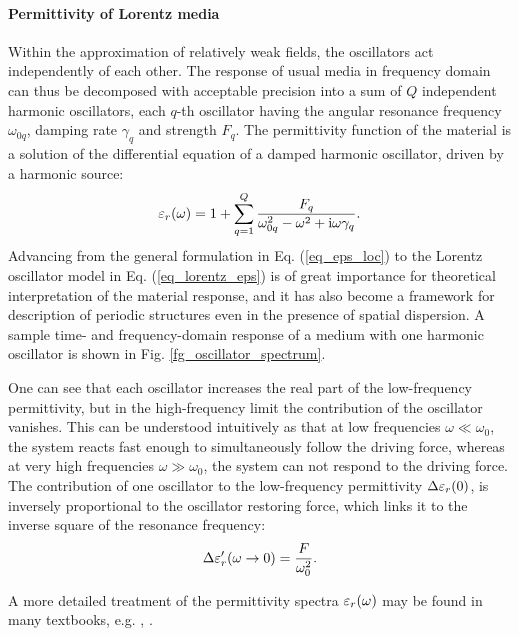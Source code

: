 \paragraph{Permittivity of Lorentz media} Within the approximation of relatively weak fields, the oscillators act independently of each other.
The response of usual media in frequency domain can thus be decomposed with acceptable precision into a sum of $Q$ independent harmonic oscillators, each $q$-th oscillator having the angular resonance frequency $\omega_{0q}$, damping rate $\gamma_q$ and strength $F_q$.
The permittivity function of the material is a solution of the differential equation of a damped harmonic oscillator, driven by a harmonic source:
\begin{equation} \varepsilon_r(\omega) = 1 + \sum_{q=1}^Q \frac{F_q}{\omega_{0q}^2 - \omega^2 + {\mathrm i}\omega\gamma_q}. \label{eq_lorentz_eps}\end{equation} 
Advancing from the general formulation in Eq. (\ref{eq_eps_loc}) to the Lorentz oscillator model in Eq. (\ref{eq_lorentz_eps}) is of great importance for theoretical interpretation of the material response, and it has also become a framework for description of periodic structures even in the presence of spatial dispersion.  %
A sample time- and frequency-domain response of a medium with one harmonic oscillator is shown in Fig. \ref{fg_oscillator_spectrum}.

One can see that each oscillator increases the real part of the low-frequency permittivity, but in the high-frequency limit the contribution of the oscillator vanishes. This can be understood intuitively as that at low frequencies $\omega \ll \omega_0$, the system reacts fast enough to simultaneously follow the driving force, whereas at very high frequencies $\omega \gg \omega_0$, the system can not respond to the driving force.
The contribution of one oscillator to the low-frequency permittivity $\Delta\varepsilon_r(0)$, is inversely proportional to the oscillator restoring force, which links it to the inverse square of the resonance frequency:
\begin{equation} \Delta \varepsilon_r'(\omega\rightarrow0) = \frac{F}{\omega_0^{2}}.  \label{eq_delta_eps} \end{equation}

A more detailed treatment of the permittivity spectra $\varepsilon_r(\omega)$ may be found in many textbooks, e.g. \cite[p. 454]{klingshirn2007semiconductor}, \cite{dresselhaus1966optical}. 

